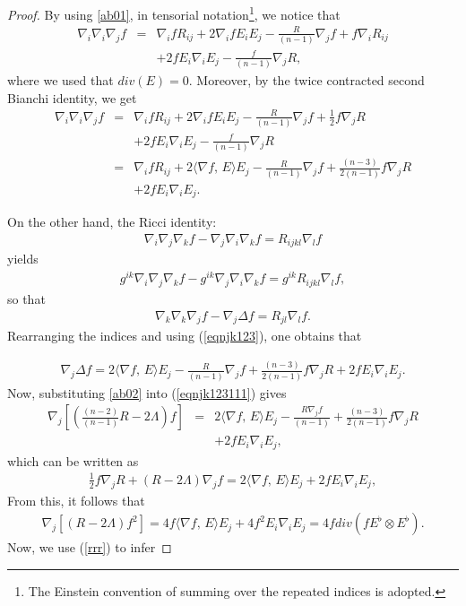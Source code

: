 \documentclass{amsart}
\numberwithin{equation}{section}
\begin{document}
\begin{proof}
By using \eqref{ab01}, in tensorial notation\footnote{The Einstein convention of summing over the repeated indices is adopted.}, we notice that
	\begin{eqnarray*}
		\nabla_i\nabla_i\nabla_jf  &=& 	\nabla_ifR_{ij} + 2	\nabla_ifE_iE_j - \frac{R}{(n-1)}	\nabla_jf + f\nabla_iR_{ij} \\
		&&+ 2fE_i\nabla_iE_j - \frac{f}{(n-1)}	\nabla_jR,
	\end{eqnarray*} where we used that $div(E)=0$. Moreover, by the twice contracted second Bianchi identity, we get
	\begin{eqnarray}
	\label{eqnjk123}
		\nabla_i\nabla_i\nabla_jf  &=& 	\nabla_ifR_{ij} + 2	\nabla_if E_iE_j - \frac{R}{(n-1)}	\nabla_jf + \frac{1}{2}f\nabla_jR\nonumber \\
		&& + 2fE_i\nabla_iE_j - \frac{f}{(n-1)}	\nabla_jR\nonumber\\
		&=& 	\nabla_ifR_{ij} + 2\langle\nabla f,\,E\rangle E_j - \frac{R}{(n-1)}	\nabla_jf + \frac{(n-3)}{2(n-1)}f\nabla_jR\nonumber\\
		&&  + 2fE_i\nabla_i E_j.
	\end{eqnarray}
	
	
	
	On the other hand, the Ricci identity:
	\begin{eqnarray*}
		\nabla_i\nabla_j\nabla_kf - 	\nabla_j\nabla_i\nabla_kf = R_{ijkl}\nabla_lf
	\end{eqnarray*} yields
	\begin{eqnarray*}
		g^{ik}\nabla_i\nabla_j\nabla_kf - 	g^{ik}\nabla_j\nabla_i\nabla_kf = g^{ik}R_{ijkl}\nabla_lf,
	\end{eqnarray*}
	so that
	\begin{eqnarray*}
		\nabla_k\nabla_k\nabla_j f - 	\nabla_j\Delta f = R_{jl}\nabla_lf.
	\end{eqnarray*} Rearranging the indices and using (\ref{eqnjk123}), one obtains that

	\begin{eqnarray}
	\label{eqnjk123111}
		\nabla_j\Delta f 
		= 2\langle\nabla f,\,E\rangle E_j - \frac{R}{(n-1)}	\nabla_jf + \frac{(n-3)}{2(n-1)}f\nabla_jR + 2fE_i\nabla_i E_j.
	\end{eqnarray} Now, substituting \eqref{ab02} into (\ref{eqnjk123111}) gives 
	\begin{eqnarray*}
		\nabla_j\left[\left(\frac{(n-2)}{(n-1)}R - 2\Lambda\right)f\right]
		&=& 2\langle\nabla f,\,E\rangle E_j - \frac{R	\nabla_jf}{(n-1)} + \frac{(n-3)}{2(n-1)}f\nabla_jR\nonumber\\&& + 2fE_i\nabla_i E_j,
	\end{eqnarray*} which can be written as
	\begin{eqnarray*}
		\frac{1}{2}f\nabla_jR+\left(R - 2\Lambda\right)\nabla_jf= 2\langle\nabla f,\,E\rangle E_j + 2fE_i\nabla_i E_j,
	\end{eqnarray*} From this, it follows that
	\begin{eqnarray*}
		\nabla_j\left[(R-2\Lambda)f^{2}\right]= 4f\langle\nabla f,\,E\rangle E_j + 4f^2E_i\nabla_i E_j = 4fdiv(fE^{\flat}\otimes E^{\flat}).
	\end{eqnarray*} Now, we use (\ref{rrr}) to infer 


\end{proof}
\end{document}
